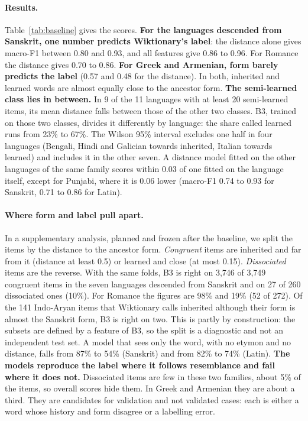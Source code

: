 \documentclass[11pt]{article}
\begin{document}
\paragraph{Results.} Table~\ref{tab:baseline} gives the scores. \textbf{For the languages descended from Sanskrit, one number predicts Wiktionary's label}: the distance alone gives macro-F1 between 0.80 and 0.93, and all features give 0.86 to 0.96. For Romance the distance gives 0.70 to 0.86. \textbf{For Greek and Armenian, form barely predicts the label} (0.57 and 0.48 for the distance). In both, inherited and learned words are almost equally close to the ancestor form. \textbf{The semi-learned class lies in between.} In 9 of the 11 languages with at least 20 semi-learned items, its mean distance falls between those of the other two classes. B3, trained on those two classes, divides it differently by language: the share called learned runs from 23\% to 67\%. The Wilson 95\% interval excludes one half in four languages (Bengali, Hindi and Galician towards inherited, Italian towards learned) and includes it in the other seven. A distance model fitted on the other languages of the same family scores within 0.03 of one fitted on the language itself, except for Punjabi, where it is 0.06 lower (macro-F1 0.74 to 0.93 for Sanskrit, 0.71 to 0.86 for Latin).

\paragraph{Where form and label pull apart.} In a supplementary analysis, planned and frozen after the baseline, we split the items by the distance to the ancestor form. \textit{Congruent} items are inherited and far from it (distance at least 0.5) or learned and close (at most 0.15). \textit{Dissociated} items are the reverse. With the same folds, B3 is right on 3,746 of 3,749 congruent items in the seven languages descended from Sanskrit and on 27 of 260 dissociated ones (10\%). For Romance the figures are 98\% and 19\% (52 of 272). Of the 141 Indo-Aryan items that Wiktionary calls inherited although their form is almost the Sanskrit form, B3 is right on two. This is partly by construction: the subsets are defined by a feature of B3, so the split is a diagnostic and not an independent test set. A model that sees only the word, with no etymon and no distance, falls from 87\% to 54\% (Sanskrit) and from 82\% to 74\% (Latin). \textbf{The models reproduce the label where it follows resemblance and fail where it does not.} Dissociated items are few in these two families, about 5\% of the items, so overall scores hide them. In Greek and Armenian they are about a third. They are candidates for validation and not validated cases: each is either a word whose history and form disagree or a labelling error.
\end{document}
